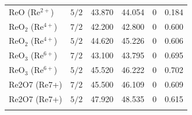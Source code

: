 \documentclass[12pt]{article}
\begin{document}
\begin{table}[H]
\begin{threeparttable}
\begin{tabular}{llrrrr}
$\mathrm{ReO}$ ($\mathrm{Re^{2+}}$) & $5/2$ & 43.870 & 44.054 & 0 & 0.184 \\
$\mathrm{ReO_2}$ ($\mathrm{Re^{4+}}$) & $7/2$ & 42.200 & 42.800 & 0 & 0.600 \\
$\mathrm{ReO_2}$ ($\mathrm{Re^{4+}}$) & $5/2$ & 44.620 & 45.226 & 0 & 0.606 \\
$\mathrm{ReO_3}$ ($\mathrm{Re^{6+}}$) & $7/2$ & 43.100 & 43.795 & 0 & 0.695 \\
$\mathrm{ReO_3}$ ($\mathrm{Re^{6+}}$) & $5/2$ & 45.520 & 46.222 & 0 & 0.702 \\
Re2O7 (Re7+) & $7/2$ & 45.500 & 46.109 & 0 & 0.609 \\
Re2O7 (Re7+) & $5/2$ & 47.920 & 48.535 & 0 & 0.615 \\
\addlinespace
\bottomrule
\end{tabular}
\end{threeparttable}
\end{table}
\end{document}
